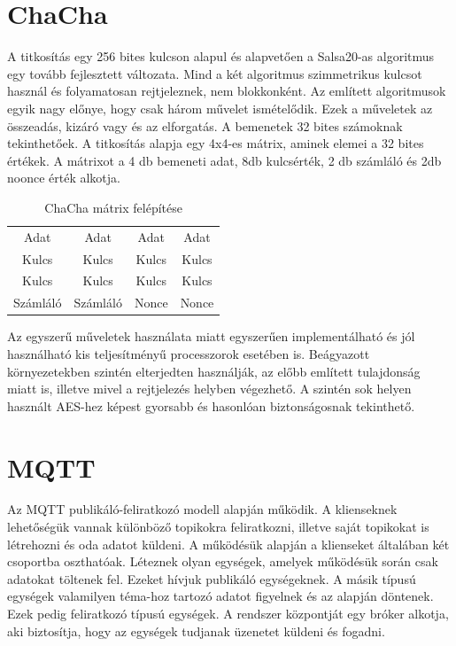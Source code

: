 
\clearpage
\section{ChaCha\cite{chacha2051:online}}
A titkosítás egy 256 bites kulcson alapul és alapvetően a Salsa20-as\cite{salsafam18:online} algoritmus egy tovább fejlesztett változata. Mind a két algoritmus szimmetrikus kulcsot használ és folyamatosan rejtjeleznek, nem blokkonként. Az említett algoritmusok egyik nagy előnye, hogy csak három művelet ismételődik. Ezek a műveletek az összeadás, kizáró vagy és az elforgatás. A bemenetek 32 bites számoknak tekinthetőek. A titkosítás alapja egy 4x4-es mátrix, aminek elemei a 32 bites értékek. A mátrixot a 4 db bemeneti adat, 8db kulcsérték, 2 db számláló és 2db noonce érték alkotja.

\begin{table}[h]
	\footnotesize
	\centering
	\begin{tabular}{ c c c c }
		Adat & Adat & Adat & Adat \\
		Kulcs & Kulcs & Kulcs & Kulcs \\
		Kulcs & Kulcs & Kulcs & Kulcs \\
		Számláló & Számláló & Nonce & Nonce \\
	\end{tabular}
	\caption{ChaCha mátrix felépítése}
	\label{tab:TabularExample}
\end{table}

Az egyszerű műveletek használata miatt egyszerűen implementálható és jól használható kis teljesítményű processzorok esetében is. Beágyazott környezetekben szintén elterjedten használják, az előbb említett tulajdonság miatt is, illetve mivel a rejtjelezés helyben végezhető. A szintén sok helyen használt AES-hez képest gyorsabb és hasonlóan biztonságosnak tekinthető.

\section{MQTT}
Az MQTT publikáló-feliratkozó modell alapján működik. A klienseknek lehetőségük vannak különböző topikokra feliratkozni, illetve saját topikokat is létrehozni és oda adatot küldeni. A működésük alapján a klienseket általában két csoportba oszthatóak. Léteznek olyan egységek, amelyek működésük során csak adatokat töltenek fel. Ezeket hívjuk publikáló egységeknek. A másik típusú egységek valamilyen téma-hoz tartozó adatot figyelnek és az alapján döntenek. Ezek pedig feliratkozó típusú egységek. A rendszer központját egy bróker alkotja, aki biztosítja, hogy az egységek tudjanak üzenetet küldeni és fogadni.

